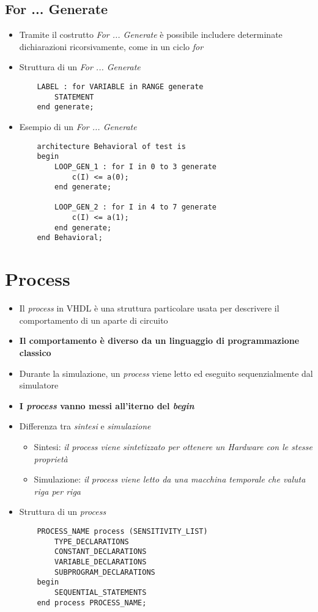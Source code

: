 \documentclass{article}
\begin{document}
\subsection{For ... Generate}
\begin{itemize}
	\item Tramite il costrutto \textit{For ... Generate} è possibile includere determinate dichiarazioni ricorsivamente, come in un ciclo \textit{for}
	\item Struttura di un \textit{For ... Generate}
	      \begin{verbatim}
    LABEL : for VARIABLE in RANGE generate
        STATEMENT
    end generate;
	      \end{verbatim}
	      
\newpage
	      
	\item Esempio di un \textit{For ... Generate}
	      \begin{verbatim}
    architecture Behavioral of test is
    begin
        LOOP_GEN_1 : for I in 0 to 3 generate
            c(I) <= a(0);
        end generate;
        
        LOOP_GEN_2 : for I in 4 to 7 generate
            c(I) <= a(1);
        end generate;
    end Behavioral;
	      \end{verbatim}
\end{itemize}

\newpage

\section{Process}
\begin{itemize}
	\item Il \textit{process} in VHDL è una struttura particolare usata per descrivere il comportamento di un aparte di circuito
	\item \textbf{Il comportamento è diverso da un linguaggio di programmazione classico}
	\item Durante la simulazione, un \textit{process} viene letto ed eseguito sequenzialmente dal simulatore
	\item \textbf{I \textit{process} vanno messi all'iterno del \textit{begin}}
	\item Differenza tra \textit{sintesi} e \textit{simulazione}
	      \begin{itemize}
	      	\item Sintesi: \textit{il process viene sintetizzato per ottenere un Hardware con le stesse proprietà}
	      	\item Simulazione: \textit{il process viene letto da una macchina temporale che valuta riga per riga}
	      \end{itemize}
	\item Struttura di un \textit{process}
	      \begin{verbatim}
    PROCESS_NAME process (SENSITIVITY_LIST)
        TYPE_DECLARATIONS
        CONSTANT_DECLARATIONS
        VARIABLE_DECLARATIONS
        SUBPROGRAM_DECLARATIONS
    begin
        SEQUENTIAL_STATEMENTS
    end process PROCESS_NAME;
	      \end{verbatim}
\end{itemize}
\end{document}

